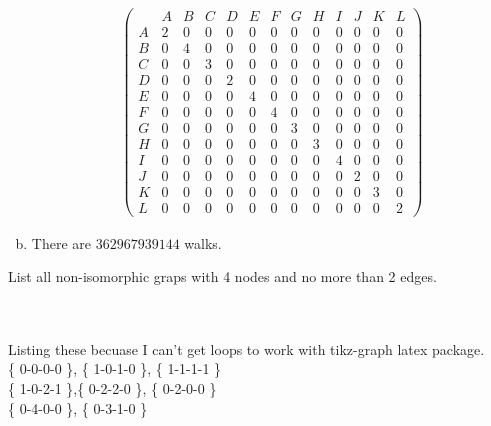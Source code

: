 \documentclass[10pt,letterpaper, cm]{hmcpset}
\begin{document}
\begin{enumerate}[(a)]
\begin{align*}
\begin{pmatrix}
             & A & B & C & D & E & F & G & H & I & J & K & L \\        

         A   & 2 & 0 & 0 & 0 & 0 & 0 & 0 & 0 & 0 & 0 & 0 & 0 \\

         B   & 0 & 4 & 0 & 0 & 0 & 0 & 0 & 0 & 0 & 0 & 0 & 0\\

         C   & 0 & 0 & 3 & 0 & 0 & 0 & 0 & 0 & 0  & 0 & 0 & 0\\

         D   & 0 & 0 & 0 & 2 & 0 & 0 & 0 & 0 & 0  & 0 & 0 & 0 \\

         E   & 0 & 0 & 0 & 0 & 4 & 0 & 0 & 0 & 0 & 0 & 0 & 0\\

         F   & 0 & 0 & 0 & 0 & 0 & 4 & 0 & 0 & 0 & 0 & 0 & 0 \\

         G   & 0 & 0 & 0 & 0 & 0 & 0 & 3 & 0 & 0 & 0 & 0 & 0\\

         H   & 0 & 0 & 0 & 0 & 0 & 0 & 0 & 3 & 0 & 0 & 0 & 0\\

         I   & 0 & 0 & 0 & 0 & 0 & 0 & 0 & 0 & 4 & 0 & 0 & 0\\
          
         J   & 0 & 0 & 0 & 0 & 0 & 0 & 0 & 0 & 0 & 2 & 0 & 0 \\

         K   & 0 & 0 & 0 & 0 & 0 & 0 & 0 & 0 & 0 & 0 & 3 & 0 \\

         L   & 0 & 0 & 0 & 0 & 0 & 0 & 0 & 0 & 0 & 0 & 0 & 2
      \end{pmatrix}  
              \end{align*}
  \item
    There are $362967939144$ walks.
\end{enumerate}
\begin{problem}[15]
  List all non-isomorphic graps with 4 nodes and no more than 2 edges.
\end{problem}\\
\\
Listing these becuase I can't get loops to work with tikz-graph latex package.\\
\left\{ 0-0-0-0 \right\}, \left\{ 1-0-1-0 \right\}, \left\{ 1-1-1-1 \right\}\\
\left\{ 1-0-2-1 \right\},\left\{ 0-2-2-0 \right\}, \left\{ 0-2-0-0 \right\}\\
\left\{ 0-4-0-0 \right\}, \left\{ 0-3-1-0 \right\}
\end{document}
